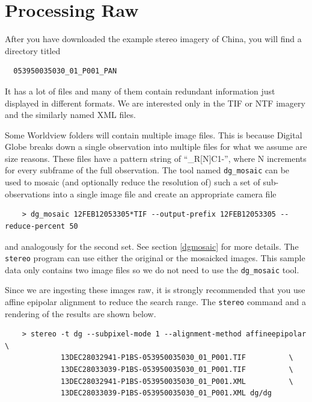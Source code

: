 \section{Processing Raw}
\label{rawdg}

After you have downloaded the example stereo imagery of China, you
will find a directory titled

\begin{verbatim}
  053950035030_01_P001_PAN
\end{verbatim}

It has a lot of files and many of them contain redundant information
just displayed in different formats. We are interested only in the TIF
or NTF imagery and the similarly named XML files.

Some Worldview folders will contain multiple image files. 
This is because Digital Globe breaks down a
single observation into multiple files for what we assume are size
reasons. These files have a pattern string of ``\_R[N]C1-'', where N
increments for every subframe of the full observation. The tool named
\texttt{dg\_mosaic} can be used to mosaic (and optionally reduce the
resolution of) such a set of sub-observations into a single image file
and create an appropriate camera file

\begin{verbatim}
    > dg_mosaic 12FEB12053305*TIF --output-prefix 12FEB12053305 --reduce-percent 50
\end{verbatim}

and analogously for the second set. See section \ref{dgmosaic} for more
details. The \texttt{stereo} program can use either the original or the 
mosaicked images.  This sample data only contains two image files so we 
do not need to use the \texttt{dg\_mosaic} tool.

Since we are ingesting these images raw, it is strongly recommended that
you use affine epipolar alignment to reduce the search range. The
\texttt{stereo} command and a rendering of the results are shown below.

\begin{verbatim}
    > stereo -t dg --subpixel-mode 1 --alignment-method affineepipolar \
             13DEC28032941-P1BS-053950035030_01_P001.TIF          \
             13DEC28033039-P1BS-053950035030_01_P001.TIF          \
             13DEC28032941-P1BS-053950035030_01_P001.XML          \
             13DEC28033039-P1BS-053950035030_01_P001.XML dg/dg
\end{verbatim}

